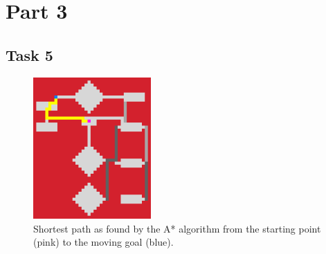 \section*{Part 3}

\subsection*{Task 5}
\begin{figure}[h!]
    \centering
    \includegraphics[width=0.4\textwidth]{"../Images/task_5.png"}
    \caption{Shortest path as found by the A* algorithm from the starting point (pink) to the moving goal (blue).}
\end{figure}
